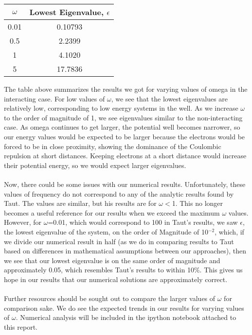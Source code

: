 \documentclass{article}
\begin{document}
\begin{center}
\begin{tabular}{|c|c|}
\hline
$\omega$&Lowest Eigenvalue, $\epsilon$\\
\hline
0.01&0.10793\\
\hline
0.5&2.2399\\
\hline
1&4.1020\\
\hline
5&17.7836\\
\hline
\end{tabular}
\end{center}

The table above summarizes the results we got for varying values of omega in the interacting case. For low values of $\omega$, we see that the lowest eigenvalues are relatively low, corresponding to low energy systems in the well. As we increase $\omega$ to the order of magnitude of 1, we see eigenvalues similar to the non-interacting case. As omega continues to get larger, the potential well becomes narrower, so our energy values would be expected to be larger because the electrons would be forced to be in close proximity, showing the dominance of the Coulombic repulsion at short distances. Keeping electrons at a short distance would increase their potential energy, so we would expect larger eigenvalues.\\
\\
Now, there could be some issues with our numerical results. Unfortunately, these values of frequency do not correspond to any of the analytic results found by Taut. The values are similar, but his results are for $\omega<$1. This no longer becomes a useful reference for our results when we exceed the maximum $\omega$ values. However, for $\omega$=0.01, which would correspond to 100 in Taut's results, we saw $\epsilon$, the lowest eigenvalue of the system, on the order of Magnitude of 10$^{-2}$, which, if we divide our numerical result in half (as we do in comparing results to Taut based on differences in mathematical assumptions between our approaches), then we see that our lowest eigenvalue is on the same order of magnitude and approximately 0.05, which resembles Taut's results to within 10\%. \cite{journal} This gives us hope in our results that our numerical solutions are approximately correct.\\
\\
Further resources should be sought out to compare the larger values of $\omega$ for comparison sake. We do see the expected trends in our results for varying values of $\omega$. Numerical analysis will be included in the ipython notebook attached to this report.
\end{document}
